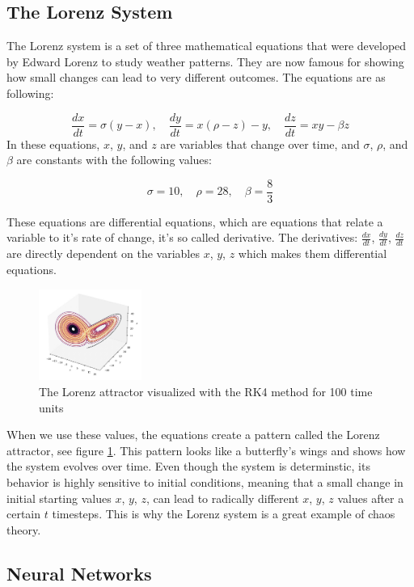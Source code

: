 \documentclass[11pt]{article}
\begin{document}
\subsection{The Lorenz System}
The Lorenz system is a set of three mathematical equations that were developed by Edward Lorenz to study weather patterns. They are now famous for showing how small changes can lead to very different outcomes. The equations are as following:

\[
\frac{dx}{dt} = \sigma(y - x), \quad \frac{dy}{dt} = x(\rho - z) - y, \quad \frac{dz}{dt} = xy - \beta z
\]
In these equations, $x$, $y$, and $z$ are variables that change over time, and $\sigma$, $\rho$, and $\beta$ are constants with the following values:  

\[
\sigma = 10, \quad \rho = 28, \quad \beta = \frac{8}{3}
\]

 These equations are differential equations, which are equations that relate a variable to it's rate of change, it's so called derivative. The derivatives: $\frac{dx}{dt}$, $\frac{dy}{dt}$, $\frac{dz}{dt}$ are directly dependent on the variables $x$, $y$, $z$ which makes them differential equations.
\begin{figure}[h]

\centering
\includegraphics[width=0.3\textwidth]{lorenz_attractor.jpeg}
\caption{The Lorenz attractor visualized with the RK4 method for 100 time units}
\label{fig:lorenz_attractor}
\end{figure}

 When we use these values, the equations create a pattern called the Lorenz attractor, see figure \ref{fig:lorenz_attractor}. This pattern looks like a butterfly's wings and shows how the system evolves over time. Even though the system is determinstic, its behavior is highly sensitive to initial conditions, meaning that a small change in initial starting values $x$, $y$, $z$, can lead to radically different $x$, $y$, $z$ values after a certain $t$ timesteps. This is why the Lorenz system is a great example of chaos theory.


\subsection{Neural Networks}
\end{document}

